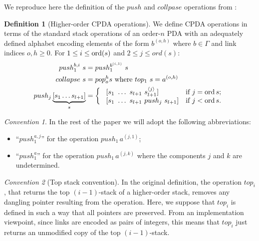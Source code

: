 \documentclass[a4paper]{article}[12pt]
\theoremstyle{remark}
\newtheorem{convention}{Convention}[section]
\theoremstyle{definition}
\newtheorem{definition}{Definition}[section]
\begin{document}
We reproduce here the definition of the $push$ and $collpase$ operations from \cite{hmos-lics08}:

\begin{definition}[Higher-order CPDA operations]
	\label{cpdastackopearations}
We define CPDA operations in terms of the standard stack operations of an order-$n$ PDA with an adequately defined alphabet encoding elements of the form $b^{(o,h)}$ where $b\in\Gamma$ and link indices $o,h \geq 0$. For $1 \leq i  \leq \mathop{\mathrm{ord}}(s)$ and $2  \leq j  \leq ord(s)$:
\begin{align*}
push_1^{b,i}\ s &= push_1^{b^{(i,1)}}\ s \\
collapse\ s &= pop_o^h s  \hbox{\ where } top_1\ s = a^{(o,h)} \\
push_j \underbrace{[ s_1 \ldots s_{l+1} ]}_{s} &=
\left\{
\begin{array}{ll}
\    [s_1\ \ldots\ s_{l+1}\ s_{l+1}^{\langle j \rangle}]  &\hbox{if $j = \mathop{\mathrm{ord}}{s}$;}\\
\    [s_1\ \ldots\ s_{l+1}\ push_j\ s_{l+1}]  &\hbox{if $j<\mathop{\mathrm{ord}}{s}$.}
\end{array}
\right.
\end{align*}
\end{definition}

\begin{convention}
	In the rest of the paper we will adopt the following abbreviations:
\begin{itemize}
	\item ``$push_1^{a,j}$'' for the operation $push_1\,a^{(j,1)}$;
	\item ``$push_1^a$'' for the operation $push_1\,a^{(j,k)}$ where the components $j$ and $k$ are undetermined.
\end{itemize}
\end{convention}

\begin{convention}[Top stack convention]
\label{conv:top_preserve_links}
In the original definition, the operation $top_i$, that returns the top $(i-1)$-stack of a higher-order stack,
 removes any dangling pointer resulting from the operation. Here, we suppose that $top_i$ is defined in such a way that all pointers are preserved. From an implementation viewpoint, since links are encoded as pairs of integers, this means that $top_i$ just returns an unmodified copy of the top $(i-1)$-stack.
\end{convention}
\end{document}
